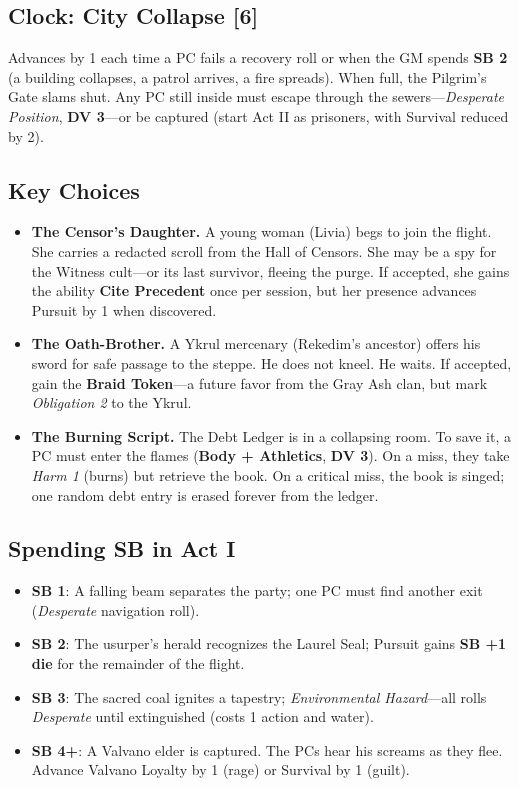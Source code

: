 \documentclass[11pt,a5paper]{book}
\newcommand{\sb}[1]{\textbf{SB #1}}
\newcommand{\dv}[1]{\textbf{DV #1}}
\newcommand{\timer}[1]{\textbf{[#1]}}
\newcommand{\trait}[1]{\textbf{#1}}
\newcommand{\condition}[1]{\textit{#1}}
\begin{document}
\subsection*{Clock: City Collapse \timer{6}}

Advances by 1 each time a PC fails a recovery roll or when the GM spends \sb{2} (a building collapses, a patrol arrives, a fire spreads). When full, the Pilgrim's Gate slams shut. Any PC still inside must escape through the sewers---\condition{Desperate Position}, \dv{3}---or be captured (start Act II as prisoners, with Survival reduced by 2).

\subsection*{Key Choices}

\begin{itemize}[leftmargin=*]
\item \textbf{The Censor's Daughter.} A young woman (Livia) begs to join the flight. She carries a redacted scroll from the Hall of Censors. She may be a spy for the Witness cult---or its last survivor, fleeing the purge. If accepted, she gains the ability \trait{Cite Precedent} once per session, but her presence advances Pursuit by 1 when discovered.
\item \textbf{The Oath-Brother.} A Ykrul mercenary (Rekedim's ancestor) offers his sword for safe passage to the steppe. He does not kneel. He waits. If accepted, gain the \textbf{Braid Token}---a future favor from the Gray Ash clan, but mark \condition{Obligation 2} to the Ykrul.
\item \textbf{The Burning Script.} The Debt Ledger is in a collapsing room. To save it, a PC must enter the flames (\textbf{Body + Athletics}, \dv{3}). On a miss, they take \condition{Harm 1} (burns) but retrieve the book. On a critical miss, the book is singed; one random debt entry is erased forever from the ledger.
\end{itemize}

\subsection*{Spending SB in Act I}

\begin{itemize}[leftmargin=*]
\item \sb{1}: A falling beam separates the party; one PC must find another exit (\condition{Desperate} navigation roll).
\item \sb{2}: The usurper's herald recognizes the Laurel Seal; Pursuit gains \sb{+1 die} for the remainder of the flight.
\item \sb{3}: The sacred coal ignites a tapestry; \condition{Environmental Hazard}---all rolls \condition{Desperate} until extinguished (costs 1 action and water).
\item \sb{4+}: A Valvano elder is captured. The PCs hear his screams as they flee. Advance Valvano Loyalty by 1 (rage) or Survival by 1 (guilt).
\end{itemize}
\end{document}
